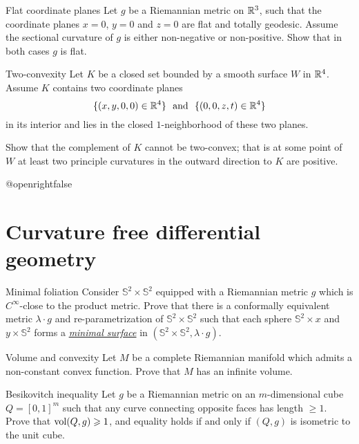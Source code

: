 \documentclass[twoside]{book}
\begin{document}
\begin{pr}{}{Flat coordinate planes}\label{Flat coordinate planes}
Let $g$ be a Riemannian metric on $\mathbb{R}^3$,
such that the coordinate planes $x=0$, $y=0$ and $z=0$ are flat and totally geodesic.
Assume the sectional curvature of $g$ is either non-negative or non-positive.
Show that in both cases $g$ is flat. 
\end{pr}

\begin{pr}{\many}{Two-convexity}\label{Two-convexity}
Let $K$ be a closed set bounded by a smooth surface $W$
in $\mathbb{R}^4$.
Assume $K$ contains two coordinate planes $$\{(x,y,0,0)\in\RR^4\}\ \ 
\text{and}
\ \ \{(0,0,z,t)\in\RR^4\}$$
in its interior 
and lies in the closed $1$-neighborhood of these two planes.

Show that the complement of $K$ cannot be two-convex;
that is at some point of $W$ 
at least two principle curvatures in the outward direction to $K$
are positive.
\end{pr}




\csname @openrightfalse\endcsname
\chapter{Curvature free differential geometry}


\begin{pr}{\thm}{Minimal foliation}\label{gromomorphic-curves} 
Consider $\mathbb{S}^2\times \mathbb{S}^2$ equipped with a Riemannian metric $g$ 
which is $C^\infty$-close to the product metric. 
Prove that there is a conformally equivalent metric $\lambda\cdot g$ and re-parametrization of $\mathbb{S}^2\times \mathbb{S}^2$
such that each sphere $\mathbb{S}^2\times x$ and $y\times \mathbb{S}^2$ forms a 
\hyperref[Minimal surface]{\emph{minimal surface}} 
in $(\mathbb{S}^2\times \mathbb{S}^2,\lambda\cdot g)$.
\end{pr}


\begin{pr}{\thm}{Volume and convexity}
\label{Volume and convexity} 
Let
$M$ be a complete Riemannian manifold which admits a non-constant
convex function. Prove that $M$ has an infinite volume.
\end{pr}

\begin{pr}{}{Besikovitch inequality}\label{Besikovitch inequality}
Let $g$ be a Riemannian metric on an $m$-dimensional cube $Q=[0,1]^m$ such that any curve connecting opposite faces has length $\ge 1$. 
Prove that $\operatorname{\rm vol}(Q,g)\geqslant 1$, 
and equality holds if and only if $(Q,g)$ is isometric to the unit cube.
\end{pr}
\end{document}
